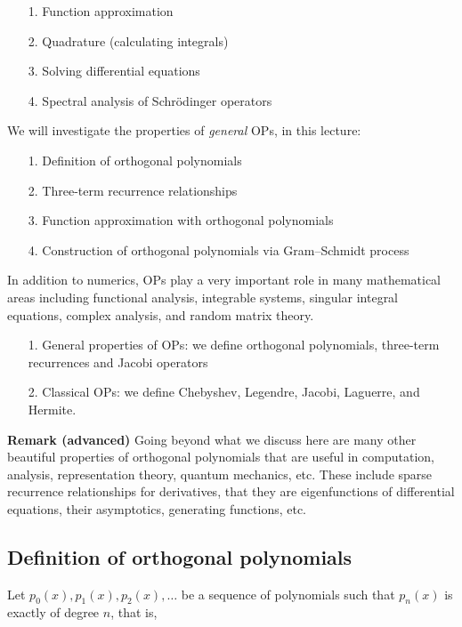 \documentclass[12pt,a4paper]{article}
\def\endash{–}
\begin{document}
\begin{itemize}
\item[1. ] Function approximation


\item[2. ] Quadrature (calculating integrals)


\item[3. ] Solving differential equations


\item[4. ] Spectral analysis of Schrödinger operators

\end{itemize}
We will investigate the properties of \emph{general} OPs, in this lecture:

\begin{itemize}
\item[1. ] Definition of orthogonal polynomials


\item[2. ] Three-term recurrence relationships


\item[3. ] Function approximation with orthogonal polynomials


\item[4. ] Construction of orthogonal polynomials via Gram\ensuremath{\endash}Schmidt process

\end{itemize}
In addition to numerics, OPs play a very important role in many mathematical areas including functional analysis, integrable systems, singular integral equations, complex analysis, and random matrix theory.

\begin{itemize}
\item[1. ] General properties of OPs: we define orthogonal polynomials, three-term recurrences and Jacobi operators


\item[2. ] Classical OPs: we define Chebyshev, Legendre, Jacobi, Laguerre, and Hermite.

\end{itemize}
\textbf{Remark (advanced)} Going beyond what we discuss here are many other beautiful properties of orthogonal  polynomials that are useful in computation, analysis, representation theory, quantum mechanics, etc. These include sparse recurrence relationships for derivatives, that they are eigenfunctions of differential equations, their asymptotics,  generating functions, etc. 

\subsection{Definition of orthogonal polynomials}
Let $p_0(x),p_1(x),p_2(x),\ensuremath{\ldots}$ be a sequence of polynomials such that $p_n(x)$ is exactly of degree $n$, that is,
\end{document}
